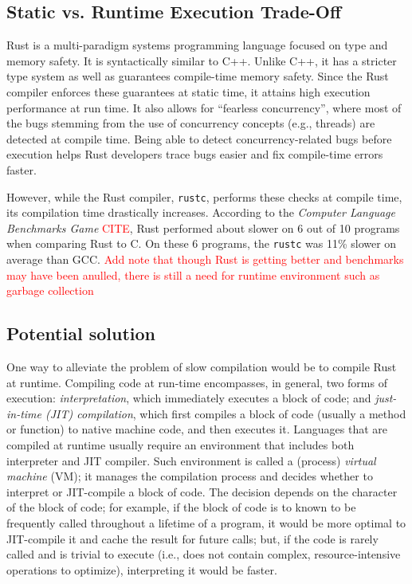 
\subsection{Static vs. Runtime Execution Trade-Off}
Rust is a multi-paradigm systems programming language focused on type and
memory safety.  It is syntactically similar to C++. Unlike C++, it has a
stricter type system as well as guarantees compile-time memory safety. Since
the Rust compiler enforces these guarantees at static time, it attains high
execution performance at run time. It also allows for ``fearless concurrency'',
where most of the bugs stemming from the use of concurrency concepts (e.g.,
threads) are detected at compile time. Being able to detect concurrency-related
bugs before execution helps Rust developers trace bugs easier and fix 
compile-time errors faster.


However, while the Rust compiler, \texttt{rustc}, performs these checks at
compile time, its compilation time drastically increases. According to the
\textit{Computer Language Benchmarks Game} \textcolor{red}{CITE}, Rust
performed about slower on 6 out of 10 programs when comparing Rust to C. On
these 6 programs, the \texttt{rustc} was 11\% slower on average than GCC. \textcolor{red}{Add note
that though Rust is getting better and benchmarks may have been anulled, there is
still a need for runtime environment such as garbage collection}

\subsection{Potential solution}


One way to alleviate the problem of slow compilation would be to compile
Rust at runtime. Compiling code at run-time encompasses, in general, two forms
of execution: \textit{interpretation}, which immediately executes a block of code;
and \textit{just-in-time (JIT) compilation}, which first compiles a block of code
(usually a method or function) to native machine code, and then executes it.
Languages that are compiled at runtime usually require an environment
that includes both interpreter and JIT compiler. Such environment is
called a (process) \textit{virtual machine} (VM); it manages
the compilation process and decides whether to interpret or JIT-compile
a block of code. The decision depends on the character of the block of code; 
for example, if the block of code is to known to be
frequently called throughout a lifetime of a program, it would be more
optimal to JIT-compile it and cache the result for future calls; but,
if the code is rarely called and is trivial to execute (i.e., does not
contain complex, resource-intensive operations to optimize), interpreting it
would be faster.

